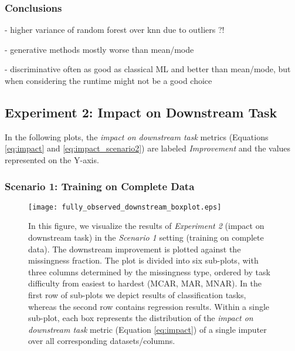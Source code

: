 \subsubsection{Conclusions}


- higher variance of random forest over knn due to outliers ?!

- generative methods mostly worse than mean/mode

- discriminative often as good as classical ML and better than mean/mode, but when considering the runtime might not be a good choice



\subsection{Experiment 2: Impact on Downstream Task}

In the following plots, the \textit{impact on downstream task} metrics (Equations \ref{eq:impact} and \ref{eq:impact_scenario2}) are labeled \textit{Improvement} and the values represented on the Y-axis.


\subsubsection{Scenario 1: Training on Complete Data}


\begin{figure}\centering
	\texttt{[image: fully\_observed\_downstream\_boxplot.eps]}

	\caption[Downstream Ranks - Fully Observed]{In this figure, we visualize the results of \textit{Experiment 2} (impact on downstream task) in the \textit{Scenario 1} setting (training on complete data). The downstream improvement is plotted against the missingness fraction. The plot is divided into six sub-plots, with three columns determined by the missingness type, ordered by task difficulty from easiest to hardest (MCAR, MAR, MNAR). In the first row of sub-plots we depict results of classification tasks, whereas the second row contains regression results. Within a single sub-plot, each box represents the distribution of the \textit{impact on downstream task} metric (Equation \ref{eq:impact}) of a single imputer over all corresponding datasets/columns.
    }
	\label{fig:fully_observed_downstream_boxplot}
\end{figure}

